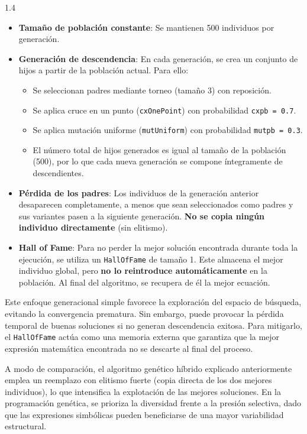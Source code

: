 \documentclass{article}
\begin{document}
\begin{spacing}{1.4}
\begin{itemize}
    \item \textbf{Tamaño de población constante}: Se mantienen 500 individuos por generación.
    \item \textbf{Generación de descendencia}: En cada generación, se crea un conjunto de hijos a partir de la población actual. Para ello:
    \begin{itemize}
        \item Se seleccionan padres mediante torneo (tamaño 3) con reposición.
        \item Se aplica cruce en un punto (\texttt{cxOnePoint}) con probabilidad \texttt{cxpb = 0.7}.
        \item Se aplica mutación uniforme (\texttt{mutUniform}) con probabilidad \texttt{mutpb = 0.3}.
        \item El número total de hijos generados es igual al tamaño de la población (500), por lo que cada nueva generación se compone íntegramente de descendientes.
    \end{itemize}
    \item \textbf{Pérdida de los padres}: Los individuos de la generación anterior desaparecen completamente, a menos que sean seleccionados como padres y sus variantes pasen a la siguiente generación. \textbf{No se copia ningún individuo directamente} (sin elitismo).
    \item \textbf{Hall of Fame}: Para no perder la mejor solución encontrada durante toda la ejecución, se utiliza un \texttt{HallOfFame} de tamaño 1. Este almacena el mejor individuo global, pero \textbf{no lo reintroduce automáticamente} en la población. Al final del algoritmo, se recupera de él la mejor ecuación.
\end{itemize}

Este enfoque generacional simple favorece la exploración del espacio de búsqueda, evitando la convergencia prematura. Sin embargo, puede provocar la pérdida temporal de buenas soluciones si no generan descendencia exitosa. Para mitigarlo, el \texttt{HallOfFame} actúa como una memoria externa que garantiza que la mejor expresión matemática encontrada no se descarte al final del proceso.

A modo de comparación, el algoritmo genético híbrido explicado anteriormente emplea un reemplazo con elitismo fuerte (copia directa de los dos mejores individuos), lo que intensifica la explotación de las mejores soluciones. En la programación genética, se prioriza la diversidad frente a la presión selectiva, dado que las expresiones simbólicas pueden beneficiarse de una mayor variabilidad estructural.


\end{spacing}
\end{document}

